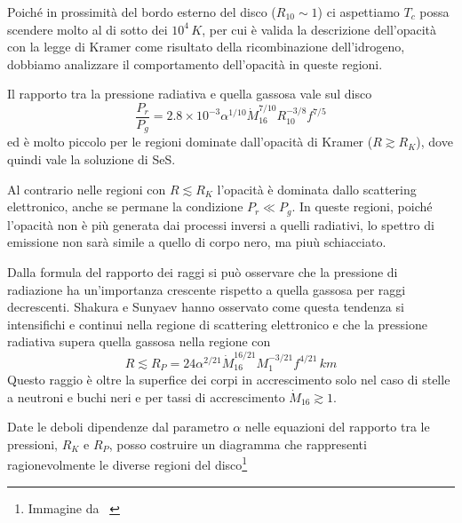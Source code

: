 \documentclass[a4paperbi]{article}
\begin{document}
	Poiché in prossimità del bordo esterno del disco ($R_{10}\sim1$) ci aspettiamo $T_c$ possa scendere molto al di sotto dei $10^4\,K$, per cui è valida la descrizione dell'opacità con la legge di Kramer come risultato della ricombinazione dell'idrogeno, dobbiamo analizzare il comportamento dell'opacità in queste regioni.
	
	Il rapporto tra la pressione radiativa e quella gassosa vale sul disco
	\begin{equation}
		\frac{P_r}{P_g}=2.8\times10^{-3}\alpha^{1/10}\dot{M}^{7/10}_{16}R^{-3/8}_{10}f^{7/5}
	\end{equation}
ed è molto piccolo per le regioni dominate dall'opacità di Kramer ($R\gtrsim R_K$), dove quindi vale la soluzione di SeS.
	
	Al contrario nelle regioni con $R\lesssim R_K$ l'opacità è dominata dallo scattering elettronico, anche se permane la condizione $P_r\ll P_g$. In queste regioni, poiché l'opacità non è più generata dai processi inversi a quelli radiativi, lo spettro di emissione non sarà simile a quello di corpo nero, ma piuù schiacciato.
	
	Dalla formula del rapporto dei raggi si può osservare che la pressione di radiazione ha un'importanza crescente rispetto a quella gassosa per raggi decrescenti. Shakura e Sunyaev hanno osservato come questa tendenza si intensifichi e continui nella regione di scattering elettronico e che la pressione radiativa supera quella gassosa nella regione con
	\begin{equation}
		R\lesssim R_P=24\alpha^{2/21}\dot{M}^{16/21}_{16}M^{-3/21}_1f^{4/21}\,km
	\end{equation}
	Questo raggio è oltre la superfice dei corpi in accrescimento solo nel caso di stelle a neutroni e buchi neri e per tassi di accrescimento $\dot{M}_{16}\gtrsim 1$.
	
	Date le deboli dipendenze dal parametro $\alpha$ nelle equazioni del rapporto tra le pressioni, $R_K$ e $R_P$, posso costruire un diagramma che rappresenti ragionevolmente le diverse regioni del disco\footnote{Immagine da ~\cite{FrankKingRaineAccretionPower}}
	
\end{document}
